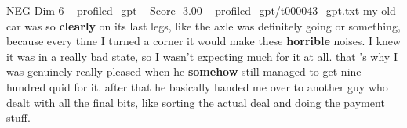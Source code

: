 \begin{textsample}{NEG Dim 6 – profiled\_gpt – Score -3.00 – profiled\_gpt/t000043\_gpt.txt}  \label{ex:f6_neg_006}
my old car was so \textbf{clearly} on its last legs, like the axle was definitely going or something, because every time I turned a corner it would make these \textbf{horrible} noises.
I knew it was in a really bad state, so I wasn't expecting much for it at all. that ’s why I was genuinely really pleased when he \textbf{somehow} still managed to get nine hundred quid for it. after that he basically handed me over to another guy who dealt with all the final bits, like sorting the actual deal and doing the payment stuff.

\end{textsample}
